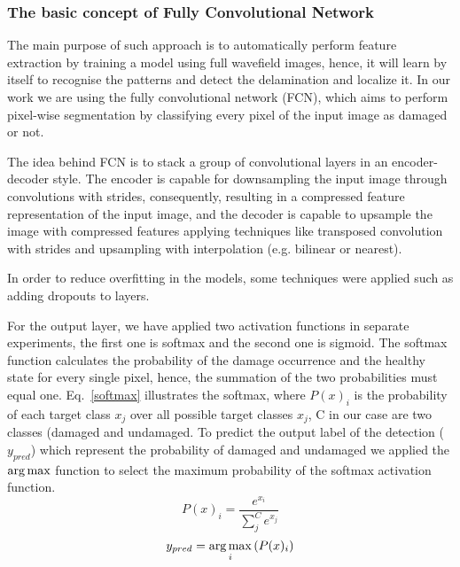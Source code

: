 \subsubsection{The basic concept of Fully Convolutional Network}
The main purpose of such approach is to automatically perform feature extraction by training a model using full wavefield images, hence, it will learn by itself to recognise the patterns and detect the delamination and localize it.
In our work we are using the fully convolutional network (FCN), which aims to perform pixel-wise segmentation by classifying every pixel of the input image as damaged or not. 

The idea behind FCN is to stack a group of convolutional layers in an encoder-decoder style. 
The encoder is capable for downsampling the input image through convolutions with strides, consequently, resulting in a compressed feature representation of the input image, and the decoder is capable to upsample the image with compressed features applying techniques like transposed convolution with strides and upsampling with interpolation (e.g. bilinear or nearest).


In order to reduce overfitting in the models, some techniques were applied such as adding dropouts to layers.

For the output layer, we have applied two activation functions in separate experiments, the first one is softmax and the second one is sigmoid. 
The softmax function calculates the probability of the damage occurrence and the healthy state for every single pixel, hence, the summation of the two probabilities must equal one. Eq.~\ref{softmax} illustrates the softmax, where \(P(x)_{i}\) is the probability of each target class \(x_{j}\) over all possible target classes \(x_{j}\), C in our case are two classes  (damaged and undamaged.
To predict the output label of the detection (\(y_{pred}\)) which represent the probability of damaged and undamaged we applied the \(\operatorname*{arg\,max}\) function to select the maximum probability of the softmax activation function.
	\begin{equation}
		P(x)_{i} = \frac{e^{x_{i}}}{\sum_{j}^{C} e^{x_{j}}}
		\label{softmax}
	\end{equation} 
	\begin{equation}
		y_{pred} = \operatorname*{arg\,max}_{i}\left( P(x)_{i} \right)
		\label{argmax}
	\end{equation}

